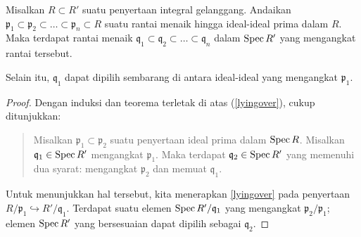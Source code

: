 \begin{proposition}
Misalkan $R \subset R'$ suatu penyertaan integral gelanggang.
Andaikan $\mathfrak{p}_1 \subset \mathfrak{p}_2 \subset \dots \subset
\mathfrak{p}_n \subset R$ suatu 
rantai menaik hingga ideal-ideal prima dalam $R$.
Maka terdapat rantai menaik $\mathfrak{q}_1 \subset \mathfrak{q}_2 \subset
\dots \subset \mathfrak{q}_n$ dalam $\operatorname{Spec} R'$ yang mengangkat rantai tersebut. 

Selain itu, $\mathfrak{q}_1$ dapat dipilih sembarang di antara ideal-ideal yang mengangkat
$\mathfrak{p}_1$.
\end{proposition} 
\begin{proof} 
Dengan induksi dan teorema terletak di atas (\cref{lyingover}), cukup ditunjukkan:
\begin{quote}
Misalkan $\mathfrak{p}_1 \subset \mathfrak{p}_2$ suatu penyertaan ideal prima dalam $\operatorname{Spec}
R$. Misalkan $\mathfrak{q}_1 \in \operatorname{Spec} R'$ mengangkat $\mathfrak{p}_1$. Maka terdapat
$\mathfrak{q}_2 \in \operatorname{Spec} R'$ yang memenuhi dua syarat: mengangkat
$\mathfrak{p}_2$ dan memuat $\mathfrak{q}_1$.
\end{quote}
Untuk menunjukkan hal tersebut, kita menerapkan \cref{lyingover} pada penyertaan
$R/\mathfrak{p}_1 \hookrightarrow R'/\mathfrak{q}_1$. Terdapat suatu elemen
$\operatorname{Spec} R'/\mathfrak{q}_1$ yang mengangkat $\mathfrak{p}_2/\mathfrak{p}_1$; elemen
$\operatorname{Spec} R'$ yang bersesuaian dapat dipilih sebagai $\mathfrak{q}_2$.
\end{proof} 

